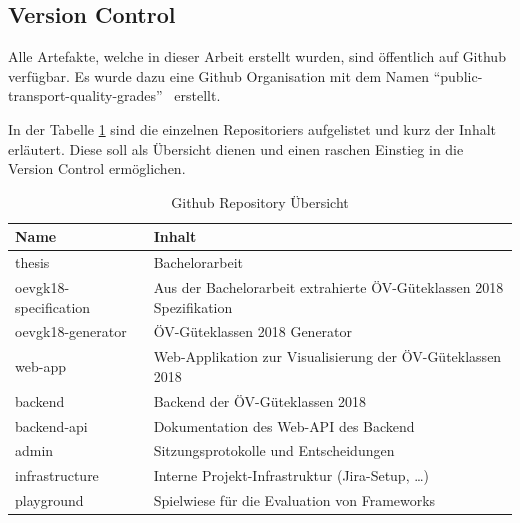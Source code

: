 \subsection{Version Control}
\label{Infrastruktur:Version Control}

Alle Artefakte, welche in dieser Arbeit erstellt wurden, sind öffentlich auf Github verfügbar.
Es wurde dazu eine Github Organisation mit dem Namen "`public-transport-quality-grades"'~\cite{github} erstellt.

In der Tabelle \ref{table:github_overview} sind die einzelnen Repositoriers aufgelistet und kurz der Inhalt erläutert.
Diese soll als Übersicht dienen und einen raschen Einstieg in die Version Control ermöglichen.

\begin{table}[H]
    \begin{tabular}{l p{10.6cm}}
        \toprule
        \textbf{Name}           & \textbf{Inhalt}\\
        \midrule
        thesis~\cite{github:thesis}
                                & Bachelorarbeit\\
        oevgk18-specification~\cite{github:oevgk18-specification}
                                & Aus der Bachelorarbeit extrahierte \gls{ÖV-Güteklassen} 2018 Spezifikation\\
        oevgk18-generator~\cite{github:oevgk18-generator}
                                & \gls{ÖV-Güteklassen} 2018 Generator\\
        web-app~\cite{github:web-app}
                                & Web-Applikation zur Visualisierung der \gls{ÖV-Güteklassen} 2018\\
        backend~\cite{github:backend}
                                & Backend der \gls{ÖV-Güteklassen} 2018\\
        backend-api~\cite{github:backend-api}
                                & Dokumentation des Web-\acs{API} des Backend\\
        admin~\cite{github:admin}
                                & Sitzungsprotokolle und Entscheidungen\\
        infrastructure~\cite{github:infrastructure}
                                & Interne Projekt-Infrastruktur (Jira-Setup, \dots)\\  
        playground~\cite{github:playground}
                                & Spielwiese für die Evaluation von Frameworks\\
                                
        \bottomrule
    \end{tabular}
    \caption{Github Repository Übersicht}
    \label{table:github_overview}
\end{table}